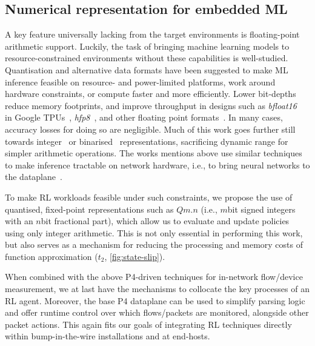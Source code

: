\documentclass[sigconf,natbib=false]{acmart}
\begin{document}
\subsection{Numerical representation for embedded ML}
A key feature universally lacking from the target environments is floating-point arithmetic support.
Luckily, the task of bringing machine learning models to resource-constrained environments without these capabilities is well-studied.
Quantisation and alternative data formats have been suggested to make ML inference feasible on resource- and power-limited platforms, work around hardware constraints, or compute faster and more efficiently.
Lower bit-depths reduce memory footprints, and improve throughput in designs such as \emph{bfloat16}~\parencite{bfloat16-blog} in Google TPUs~\parencite{DBLP:journals/sigops/XieDMKVZT18}, \emph{hfp8}~\parencite{DBLP:conf/nips/SunCCWVSCZG19}, and other floating point formats~\parencite{DBLP:journals/corr/abs-2007-01530}.
In many cases, accuracy losses for doing so are negligible.
Much of this work goes further still towards integer~\parencite{tensorrt-8bit} or binarised~\parencite{DBLP:journals/corr/MiyashitaLM16,DBLP:conf/eccv/RastegariORF16,DBLP:journals/corr/KimS16,DBLP:conf/nips/HubaraCSEB16} representations, sacrificing dynamic range for simpler arithmetic operations.
The works mentions above use similar techniques to make inference tractable on network hardware, i.e., to bring neural networks to the dataplane~\parencite{DBLP:journals/corr/abs-2009-02353,DBLP:conf/sigcomm/SanvitoSB18,DBLP:journals/corr/abs-1801-05731}.

To make RL workloads feasible under such constraints, we propose the use of quantised, fixed-point representations such as $Qm.n$ (i.e., $m$\si{bit} signed integers with an $n$\si{bit} fractional part), which allow us to evaluate and update policies using only integer arithmetic.
This is not only essential in performing this work, but also serves as a mechanism for reducing the processing and memory costs of function approximation ($t_2$, \cref{fig:state-slip}).

When combined with the above P4-driven techniques for in-network flow/device measurement, we at last have the mechanisms to collocate the key processes of an RL agent.
Moreover, the base P4 dataplane can be used to simplify parsing logic and offer runtime control over which flows/packets are monitored, alongside other packet actions.
This again fits our goals of integrating RL techniques directly within bump-in-the-wire installations and at end-hosts.
\end{document}
